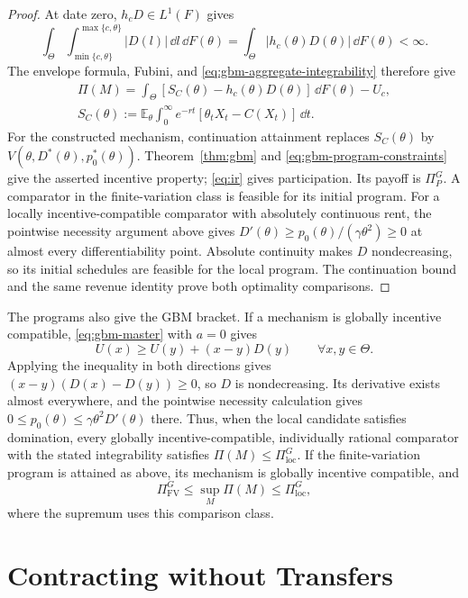 \documentclass[12pt]{article}
\newcommand{\E}{\mathbb{E}}
\begin{document}
\begin{proof}
At date zero, \(h_cD\in L^1(F)\) gives
\[
  \int_\Theta\int_{\min\{c,\theta\}}^{\max\{c,\theta\}}
      |D(l)|\,\dd l\,\dd F(\theta)
   =\int_\Theta|h_c(\theta)D(\theta)|\,\dd F(\theta)<\infty.
\]
The envelope formula, Fubini, and
\eqref{eq:gbm-aggregate-integrability} therefore give
\[
\begin{gathered}
  \Pi(M)=\int_\Theta
     [S_C(\theta)-h_c(\theta)D(\theta)]\,\dd F(\theta)-U_c,
  \\
  S_C(\theta):=\E_\theta\int_0^\infty e^{-rt}
       [\theta_tX_t-C(X_t)]\,\dd t.
\end{gathered}
\]
For the constructed mechanism, continuation attainment replaces
\(S_C(\theta)\) by
\(V(\theta,D^*(\theta),p_0^*(\theta))\). Theorem~\ref{thm:gbm}
and \eqref{eq:gbm-program-constraints} give the asserted incentive
property; \eqref{eq:ir} gives participation. Its payoff is
\(\Pi_P^G\). A comparator in the finite-variation class is feasible
for its initial program. For a locally incentive-compatible
comparator with absolutely continuous rent, the pointwise necessity
argument above gives \(D'(\theta)\geq p_0(\theta)/(\gamma\theta^2)
\geq0\) at almost every differentiability point. Absolute
continuity makes \(D\) nondecreasing, so its initial schedules are
feasible for the local program. The continuation bound and the same
revenue identity prove both optimality comparisons.
\end{proof}

The programs also give the GBM bracket. If a mechanism is globally
incentive compatible, \eqref{eq:gbm-master} with \(a=0\)
gives
\[
  U(x)\geq U(y)+(x-y)D(y)
  \qquad\forall x,y\in\Theta.
\]
Applying the inequality in both directions gives
\((x-y)(D(x)-D(y))\geq0\), so \(D\) is nondecreasing.
Its derivative exists almost everywhere, and the
pointwise necessity calculation gives
\(0\leq p_0(\theta)\leq\gamma\theta^2D'(\theta)\) there. Thus,
when the local candidate satisfies domination, every globally
incentive-compatible, individually rational comparator with the
stated integrability satisfies \(\Pi(M)\leq\Pi_{\mathrm{loc}}^G\).
If the finite-variation program is attained as above, its mechanism
is globally incentive compatible, and
\[
  \Pi_{\mathrm{FV}}^G\leq\sup_M\Pi(M)\leq\Pi_{\mathrm{loc}}^G,
\]
where the supremum uses this comparison class.

\section{Contracting without Transfers}
\label{app:no-transfers}
\end{document}
